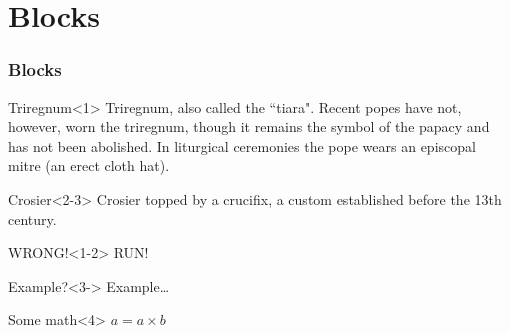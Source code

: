 \documentclass[hyperref=bookmarks]{beamer}
\begin{document}
	\section{Blocks}
	\begin{frame}
		\frametitle{Blocks}
		\begin{block}{Triregnum}<1>
			Triregnum, also called the ``tiara". Recent popes have not, however, worn the triregnum, though it remains the symbol of the papacy and has not been abolished. In liturgical ceremonies the pope wears an episcopal mitre (an erect cloth hat).
		\end{block}
		\begin{block}{Crosier}<2-3>
			Crosier topped by a crucifix, a custom established before the 13th century.
		\end{block}
		\begin{alertblock}{WRONG!}<1-2>
			RUN!
		\end{alertblock}
		\begin{exampleblock}{Example?}<3->
			Example\ldots
		\end{exampleblock}
		\begin{block}{Some math}<4>
			$ a = a \times b $
		\end{block}
	\end{frame}
\end{document}
